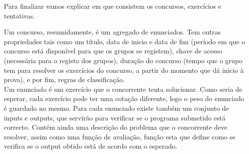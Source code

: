Para finalizar vamos explicar em que consistem os concursos, exercícios e tentativas.

Um concurso, resumidamente, é um agregado de enunciados. 
Tem outras propriedades tais como um título, data de inicio e data de fim (período em que o concurso está disponível para que os grupos se registem), 
chave de acesso (necessária para o registo dos grupos), duração do concurso (tempo que o grupo tem para resolver os exercícios do concurso, 
a partir do momento que dá inicio à prova), e por fim, regras de classificação.\\

Um enunciado é um exercício que o concorrente tenta solucionar. Como seria de esperar, cada exercício pode ter uma cotação diferente, 
logo o peso do enunciado é guardado no mesmo. 
Para cada enunciado existe também um conjunto de inputs e outputs, que servirão para verificar se o programa submetido está correcto. 
Contém ainda uma descrição do problema que o concorrente deve resolver, assim como uma função de avaliação, função esta que define como se verifica se o output obtido está de acordo com o esperado.\\
